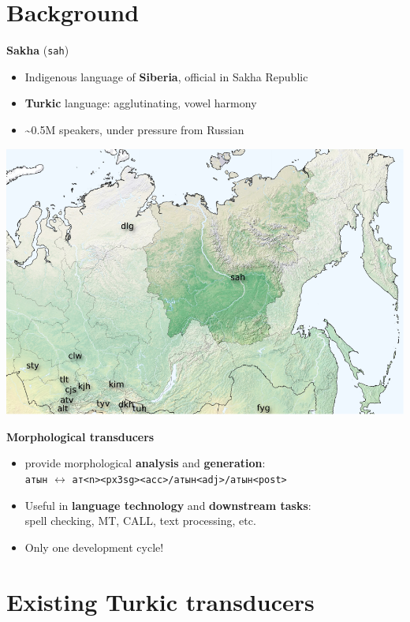 \documentclass[a0paper,fleqn]{betterposter}
\newcommand{\mtag}[1]{\texttt{{\color{lightgray}<}#1{\color{lightgray}>}}}
\begin{document}
{\section{Background}
\textbf{Sakha} (\texttt{sah})
\begin{itemize}
\item Indigenous language of \textbf{Siberia}, official in Sakha Republic
\item \textbf{Turkic} language: agglutinating, vowel harmony
\item \textasciitilde{}0.5M speakers, under pressure from Russian
\end{itemize}
\begin{center}
\includegraphics[width=1\textwidth]{img/map.pdf}
\end{center}

\textbf{Morphological transducers}
\begin{itemize}
\item provide morphological \textbf{analysis} and \textbf{generation}:\\
\texttt{атын} $\leftrightarrow$ \texttt{ат\mtag{n}\mtag{px3sg}\mtag{acc}/атын\mtag{adj}/атын\mtag{post}}
\item Useful in \textbf{language technology} and \textbf{downstream tasks}:\\
spell checking, MT, CALL, text processing, etc.
\item Only one development cycle!
\end{itemize}

\section{Existing Turkic transducers}

}
\end{document}
